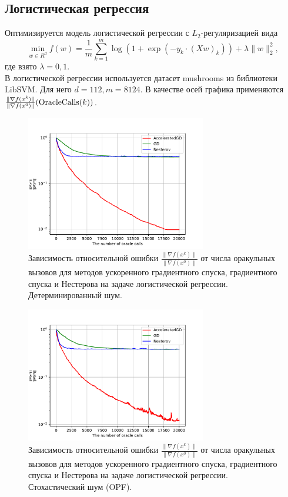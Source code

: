 \documentclass{article}
\begin{document}
\subsection{Логистическая регрессия}
Оптимизируется модель логистической регрессии с $L_2$-регуляризацией вида
\begin{equation}
 \min\limits_{w \in R^d} f(w) = \frac{1}{m}\sum\limits_{k = 1}^m \log(1 + \exp(-y_k \cdot (Xw)_k)) + \lambda \|w\|_2^2,
\end{equation}
где взято $\lambda = 0,1$.\\
В логистической регрессии используется датасет mushrooms из библиотеки LibSVM. Для него $d = 112, m = 8124$. В качестве осей графика применяются $\frac{\|\nabla f(x^k)\|}{\|\nabla f(x^0)\|} (\textnormal{OracleCalls}(k))$.
\begin{figure}[!htbp]
\centering
  \includegraphics[width=0.7\textwidth]{../figures/Non_stochastic_Logreg_AGD_GD_Nesterov_18_1e-06_0.0001.pdf}
 \caption{Зависимость относительной ошибки $\frac{\|\nabla f(x^k)\|}{\|\nabla f(x^0)\|}$ от числа оракульных вызовов для методов ускоренного градиентного спуска, градиентного спуска и Нестерова на задаче логистической регрессии. Детерминированный шум.}
  \label{fig:non-stochastic_logreg}
\end{figure}
\begin{figure}[!htbp]
\centering
  \includegraphics[width=0.7\textwidth]{../figures/Stochastic_Logreg_AGD_GD_Nesterov_18_1e-06_0.0001.pdf}
 \caption{Зависимость относительной ошибки $\frac{\|\nabla f(x^k)\|}{\|\nabla f(x^0)\|}$ от числа оракульных вызовов для методов ускоренного градиентного спуска, градиентного спуска и Нестерова на задаче логистической регрессии. Стохастический шум (OPF).}
  \label{fig:non-stochastic_logreg}
\end{figure}
\end{document}
